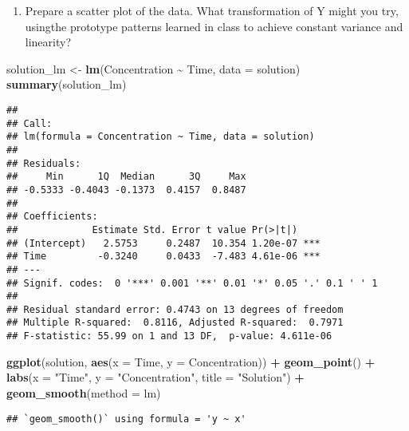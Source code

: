 \documentclass[
]{article}
\newenvironment{Shaded}{\begin{snugshade}}{\end{snugshade}}
\newcommand{\AttributeTok}[1]{\textcolor[rgb]{0.13,0.29,0.53}{#1}}
\newcommand{\FunctionTok}[1]{\textcolor[rgb]{0.13,0.29,0.53}{\textbf{#1}}}
\newcommand{\NormalTok}[1]{#1}
\newcommand{\OtherTok}[1]{\textcolor[rgb]{0.56,0.35,0.01}{#1}}
\newcommand{\SpecialCharTok}[1]{\textcolor[rgb]{0.81,0.36,0.00}{\textbf{#1}}}
\newcommand{\StringTok}[1]{\textcolor[rgb]{0.31,0.60,0.02}{#1}}
\providecommand{\tightlist}{%
  \setlength{\itemsep}{0pt}\setlength{\parskip}{0pt}}
\begin{document}
\begin{enumerate}
\def\labelenumi{(\alph{enumi})}
\tightlist
\item
  Prepare a scatter plot of the data. What transformation of Y might you
  try, usingthe prototype patterns learned in class to achieve constant
  variance and linearity?
\end{enumerate}

\begin{Shaded}
\begin{Highlighting}[]
\NormalTok{solution\_lm }\OtherTok{\textless{}{-}} \FunctionTok{lm}\NormalTok{(Concentration }\SpecialCharTok{\textasciitilde{}}\NormalTok{ Time, }\AttributeTok{data =}\NormalTok{ solution)}
\FunctionTok{summary}\NormalTok{(solution\_lm)}
\end{Highlighting}
\end{Shaded}

\begin{verbatim}
## 
## Call:
## lm(formula = Concentration ~ Time, data = solution)
## 
## Residuals:
##     Min      1Q  Median      3Q     Max 
## -0.5333 -0.4043 -0.1373  0.4157  0.8487 
## 
## Coefficients:
##             Estimate Std. Error t value Pr(>|t|)    
## (Intercept)   2.5753     0.2487  10.354 1.20e-07 ***
## Time         -0.3240     0.0433  -7.483 4.61e-06 ***
## ---
## Signif. codes:  0 '***' 0.001 '**' 0.01 '*' 0.05 '.' 0.1 ' ' 1
## 
## Residual standard error: 0.4743 on 13 degrees of freedom
## Multiple R-squared:  0.8116, Adjusted R-squared:  0.7971 
## F-statistic: 55.99 on 1 and 13 DF,  p-value: 4.611e-06
\end{verbatim}

\begin{Shaded}
\begin{Highlighting}[]
\FunctionTok{ggplot}\NormalTok{(solution, }\FunctionTok{aes}\NormalTok{(}\AttributeTok{x =}\NormalTok{ Time, }\AttributeTok{y =}\NormalTok{ Concentration)) }\SpecialCharTok{+}
  \FunctionTok{geom\_point}\NormalTok{() }\SpecialCharTok{+}
  \FunctionTok{labs}\NormalTok{(}\AttributeTok{x =} \StringTok{"Time"}\NormalTok{, }\AttributeTok{y =} \StringTok{"Concentration"}\NormalTok{, }\AttributeTok{title =} \StringTok{"Solution"}\NormalTok{) }\SpecialCharTok{+}
  \FunctionTok{geom\_smooth}\NormalTok{(}\AttributeTok{method =}\NormalTok{ lm)}
\end{Highlighting}
\end{Shaded}

\begin{verbatim}
## `geom_smooth()` using formula = 'y ~ x'
\end{verbatim}
\end{document}
